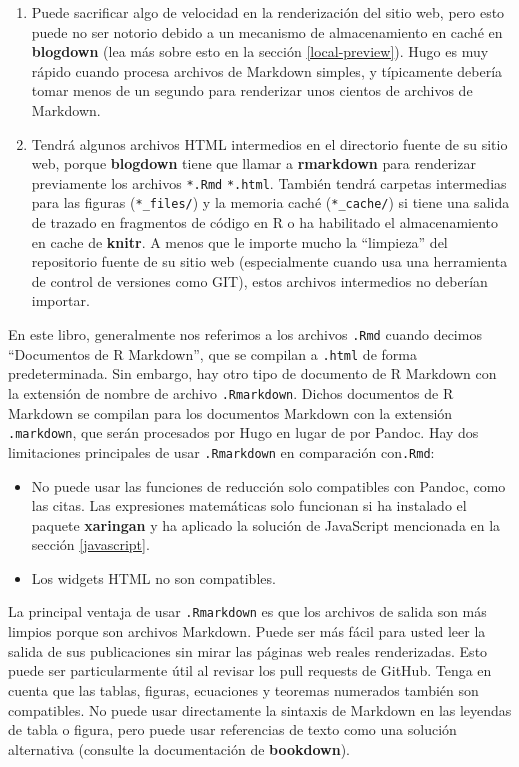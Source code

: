 \documentclass[12pt,]{krantz}
\theoremstyle{definition}
\theoremstyle{definition}
\theoremstyle{definition}
\theoremstyle{remark}
\begin{document}
\begin{enumerate}
\def\labelenumi{\arabic{enumi}.}
\item
  Puede sacrificar algo de velocidad en la renderización del sitio web,
  pero esto puede no ser notorio debido a un mecanismo de almacenamiento
  en caché en \textbf{blogdown} (lea más sobre esto en la sección
  \ref{local-preview}). Hugo es muy rápido cuando procesa archivos de
  Markdown simples, y típicamente debería tomar menos de un segundo para
  renderizar unos cientos de archivos de Markdown.
\item
  Tendrá algunos archivos HTML intermedios en el directorio fuente de su
  sitio web, porque \textbf{blogdown} tiene que llamar a
  \textbf{rmarkdown} para renderizar previamente los archivos
  \texttt{*.Rmd} \texttt{*.html}. También tendrá carpetas intermedias
  para las figuras (\texttt{*\_files/}) y la memoria caché
  (\texttt{*\_cache/}) si tiene una salida de trazado en fragmentos de
  código en R o ha habilitado el almacenamiento en cache de
  \textbf{knitr}. A menos que le importe mucho la ``limpieza'' del
  repositorio fuente de su sitio web (especialmente cuando usa una
  herramienta de control de versiones como GIT), estos archivos
  intermedios no deberían importar.
\end{enumerate}

En este libro, generalmente nos referimos a los archivos \texttt{.Rmd}
cuando decimos ``Documentos de R Markdown'', que se compilan a
\texttt{.html} de forma predeterminada. Sin embargo, hay otro tipo de
documento de R Markdown con la extensión de nombre de archivo
\texttt{.Rmarkdown}. Dichos documentos de R Markdown se compilan para
los documentos Markdown con la extensión \texttt{.markdown}, que serán
procesados por Hugo en lugar de por Pandoc. Hay dos limitaciones
principales de usar \texttt{.Rmarkdown} en comparación con\texttt{.Rmd}:

\begin{itemize}
\item
  No puede usar las funciones de reducción solo compatibles con Pandoc,
  como las citas. Las expresiones matemáticas solo funcionan si ha
  instalado el paquete \textbf{xaringan} \citep{R-xaringan} y ha
  aplicado la solución de JavaScript mencionada en la sección
  \ref{javascript}.
\item
  Los widgets HTML no son compatibles.
\end{itemize}

La principal ventaja de usar \texttt{.Rmarkdown} es que los archivos de
salida son más limpios porque son archivos Markdown. Puede ser más fácil
para usted leer la salida de sus publicaciones sin mirar las páginas web
reales renderizadas. Esto puede ser particularmente útil al revisar los
pull requests de GitHub. Tenga en cuenta que las tablas, figuras,
ecuaciones y teoremas numerados también son compatibles. No puede usar
directamente la sintaxis de Markdown en las leyendas de tabla o figura,
pero puede usar referencias de texto como una solución alternativa
(consulte la documentación de \textbf{bookdown}).
\end{document}

